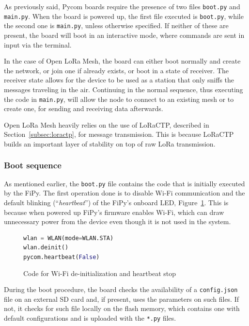 				As previously said, Pycom boards require the presence of two files \texttt{boot.py} and \texttt{main.py}.
				When the board is powered up, the first file executed is \texttt{boot.py}, while the second one is \texttt{main.py}, unless otherwise specified.
				If neither of these are present, the board will boot in an interactive mode, where commands are sent in input via the terminal.
				
				In the case of Open LoRa Mesh, the board can either boot normally and create the network, or join one if already exists, or boot in a state of receiver.
				The receiver state allows for the device to be used as a station that only sniffs the messages traveling in the air.				
				Continuing in the normal sequence, thus executing the code in \texttt{main.py}, will allow the node to connect to an existing mesh or to create one, for sending and receiving data afterwards.
				
				Open LoRa Mesh heavily relies on the use of LoRaCTP, described in Section~\ref{subsec:loractp}, for message transmission.
				This is because LoRaCTP builds an important layer of stability on top of raw LoRa transmission.
				
			\subsubsection{Boot sequence}
			
				As mentioned earlier, the \texttt{boot.py} file contains the code that is initially executed by the FiPy.
				The first operation done is to disable Wi-Fi communication and the default blinking (``\textit{heartbeat}'') of the FiPy's onboard LED, Figure~\ref{code:boot_wifi}.
				This is because when powered up FiPy's firmware enables Wi-Fi, which can draw unnecessary power from the device even though it is not used in the system.

				\begin{figure}[H]
					\begin{lstlisting}[language=Python]
wlan = WLAN(mode=WLAN.STA)
wlan.deinit()
pycom.heartbeat(False)
					\end{lstlisting}
					\caption{Code for Wi-Fi de-initialization and heartbeat stop}
					\label{code:boot_wifi}
				\end{figure}
			
				During the boot procedure, the board checks the availability of a \texttt{config.json} file on an external SD card and, if present, uses the parameters on such files.
				If not, it checks for such file locally on the flash memory, which contains one with default configurations and is uploaded with the \texttt{*.py} files.

